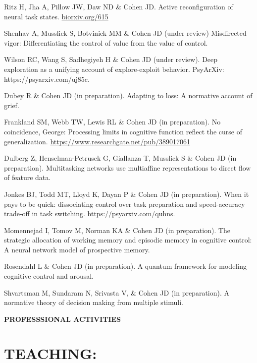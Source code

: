 \documentclass[10 pt]{article}
\begin{document}
Ritz H, Jha A, Pillow JW, Daw ND \& Cohen JD. Active reconfiguration of neural task states. \href{https://www.biorxiv.org/content/10.1101/2024.09.29.615736v1}{biorxiv.org/615}

Shenhav A, Musslick S, Botvinick MM \& Cohen JD (under review) Misdirected vigor: Differentiating
the control of value from the value of control.

Wilson RC, Wang S, Sadhegiyeh H \& Cohen JD (under review). Deep exploration as a unifying account of explore-exploit behavior. PsyArXiv: https://psyarxiv.com/uj85c.

Dubey R \& Cohen JD (in preparation). Adapting to loss: A normative account of grief.

Frankland SM, Webb TW, Lewis RL \& Cohen JD (in preparation). No coincidence, George: Processing limits in cognitive function reflect the curse of generalization. \href{https://www.researchgate.net/publication/389017061_No_Coincidence_George_Processing_Limits_in_Cognitive_Function_Reflect_the_Curse_of_Generalization}
{https://www.researchgate.net/pub/389017061}

Dulberg Z, Henselman-Petrusek G, Giallanza T, Musslick S \& Cohen JD (in preparation). Multitasking networks use multiaffine representations to direct flow of feature data.

Jonkes BJ, Todd MT, Lloyd K, Dayan P \& Cohen JD (in preparation). When it pays to be quick: dissociating control over task preparation and speed-accuracy trade-off in task switching. https://psyarxiv.com/quhns.

Momennejad I, Tomov M, Norman KA \& Cohen JD (in preparation). The strategic allocation of working memory and episodic memory in cognitive control: A neural network model of prospective memory.

Rosendahl L \& Cohen JD (in preparation). A quantum framework for modeling cognitive control and arousal.

Shvartsman M, Sundaram N, Srivasta V, \& Cohen JD (in preparation). A normative theory of decision making from multiple stimuli.

    \newpage


    \begin{center}
{\fontsize{15pt}{16 pt}\selectfont \textbf{PROFESSSIONAL ACTIVITIES}}
    \end{center}

\section*{TEACHING:} \label{secTEACHING}
    \smallskip
\end{document}
